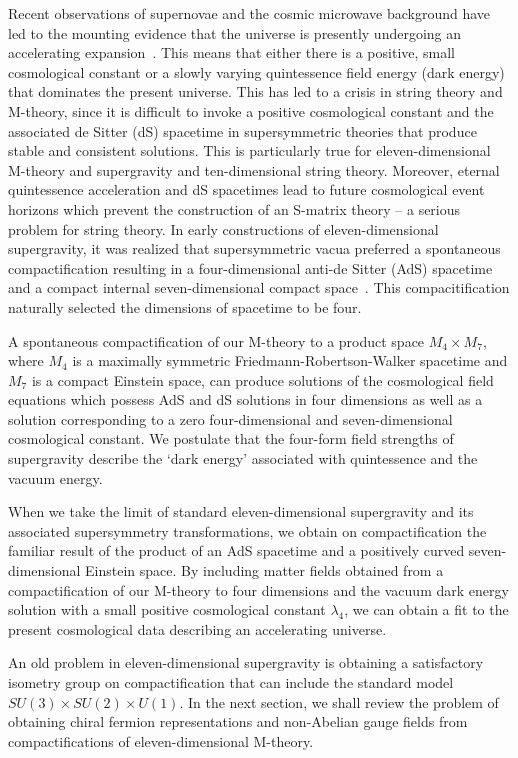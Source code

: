 \documentclass[a4paper,12pt]{article}
\begin{document}
Recent observations of supernovae and the cosmic microwave background have led to the
mounting evidence that the universe is presently undergoing an accelerating
expansion~\cite{Perlmutter,Netterfield}. This means that either there is a positive,
small cosmological constant or a slowly varying quintessence field energy (dark
energy)~\cite{Caldwell} that dominates the present universe. This has led to a
crisis in string theory and M-theory, since it is difficult to invoke a positive
cosmological constant and the associated de Sitter (dS) spacetime in supersymmetric
theories that produce stable and consistent solutions. This is particularly true for
eleven-dimensional M-theory and supergravity and ten-dimensional string theory.
Moreover, eternal quintessence acceleration and dS spacetimes lead to future
cosmological event horizons which prevent the construction of an S-matrix theory --
a serious problem for string theory. In early constructions of eleven-dimensional
supergravity, it was realized that supersymmetric vacua preferred a spontaneous
compactification resulting in a four-dimensional anti-de Sitter (AdS) spacetime and
a compact internal seven-dimensional compact
space~\cite{Freund,Freund2,Englert,Duff2}. This compacitification naturally selected
the dimensions of spacetime to be four.

A spontaneous compactification of our M-theory to a product space
$M_4\times M_7$, where $M_4$ is a maximally symmetric
Friedmann-Robertson-Walker spacetime and $M_7$ is a compact
Einstein space, can produce solutions of the cosmological field
equations which possess AdS and dS
solutions in four dimensions as well as a solution corresponding
to a zero four-dimensional and seven-dimensional cosmological
constant. We postulate that the four-form field
strengths of supergravity describe the `dark energy' associated with quintessence
and the vacuum energy.

When we take the limit of standard
eleven-dimensional supergravity and its associated supersymmetry
transformations, we obtain on compactification the familiar
result of the product of an AdS spacetime and a positively
curved seven-dimensional Einstein space. By including matter fields obtained from a
compactification of our M-theory to four dimensions and the vacuum dark energy
solution with a small positive cosmological constant $\lambda_4$, we can obtain a fit
to the present cosmological data describing an accelerating universe.

An old problem in eleven-dimensional supergravity is
obtaining a satisfactory isometry group on compactification
that can include the standard model $SU(3)\times SU(2)\times
U(1)$. In the next section, we shall review the problem of obtaining chiral fermion
representations and non-Abelian gauge fields from compactifications of
eleven-dimensional M-theory.
\end{document}
